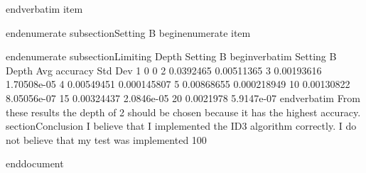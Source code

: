 end{verbatim}
item

end{enumerate}
subsection{Setting B}
begin{enumerate}
item

end{enumerate}
subsection{Limiting Depth Setting B}
begin{verbatim}
Setting B
Depth	Avg accuracy	Std Dev	
1		0		0
2		0.0392465		0.00511365
3		0.00193616		1.70508e-05
4		0.00549451		0.000145807
5		0.00868655		0.000218949
10		0.00130822		8.05056e-07
15		0.00324437		2.0846e-05
20		0.0021978		5.9147e-07
end{verbatim}
From these results the depth of 2 should be chosen because it has the highest accuracy.
section{Conclusion}
I believe that I implemented the ID3 algorithm correctly. I do not believe that my test was implemented 100%

end{document}